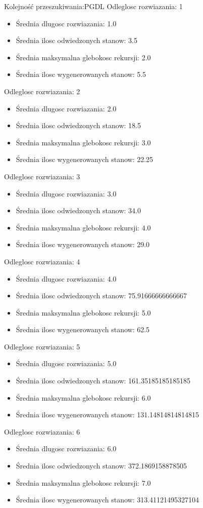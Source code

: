 \documentclass{classrep}
\begin{document}
		Kolejność przeszukiwania:PGDL
		Odleglosc rozwiazania: 1
		\begin{itemize}
			\item Średnia dlugosc rozwiazania: 1.0
			\item Średnia ilosc odwiedzonych stanow: 3.5
			\item Średnia maksymalna glebokosc rekursji: 2.0
			\item Średnia ilosc wygenerowanych stanow: 5.5
		\end{itemize}
		Odleglosc rozwiazania: 2
		\begin{itemize}
			\item Średnia dlugosc rozwiazania: 2.0
			\item Średnia ilosc odwiedzonych stanow: 18.5
			\item Średnia maksymalna glebokosc rekursji: 3.0
			\item Średnia ilosc wygenerowanych stanow: 22.25
		\end{itemize}
		Odleglosc rozwiazania: 3
		\begin{itemize}
			\item Średnia dlugosc rozwiazania: 3.0
			\item Średnia ilosc odwiedzonych stanow: 34.0
			\item Średnia maksymalna glebokosc rekursji: 4.0
			\item Średnia ilosc wygenerowanych stanow: 29.0
		\end{itemize}
		Odleglosc rozwiazania: 4
		\begin{itemize}
			\item Średnia dlugosc rozwiazania: 4.0
			\item Średnia ilosc odwiedzonych stanow: 75.91666666666667
			\item Średnia maksymalna glebokosc rekursji: 5.0
			\item Średnia ilosc wygenerowanych stanow: 62.5
		\end{itemize}
		Odleglosc rozwiazania: 5
		\begin{itemize}
			\item Średnia dlugosc rozwiazania: 5.0
			\item Średnia ilosc odwiedzonych stanow: 161.35185185185185
			\item Średnia maksymalna glebokosc rekursji: 6.0
			\item Średnia ilosc wygenerowanych stanow: 131.14814814814815
		\end{itemize}
		Odleglosc rozwiazania: 6
		\begin{itemize}
			\item Średnia dlugosc rozwiazania: 6.0
			\item Średnia ilosc odwiedzonych stanow: 372.1869158878505
			\item Średnia maksymalna glebokosc rekursji: 7.0
			\item Średnia ilosc wygenerowanych stanow: 313.41121495327104
		\end{itemize}
		
\end{document}
